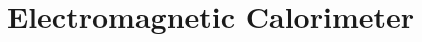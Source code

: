 \documentclass[11pt,twoside,notitlepage]{book}
\begin{document}
\frontmatter

\pagestyle{fancy}

\mainmatter

\setcounter{chapter}{3}
\setcounter{page}{1}

\chapter{Electromagnetic Calorimeter}





\end{document}
